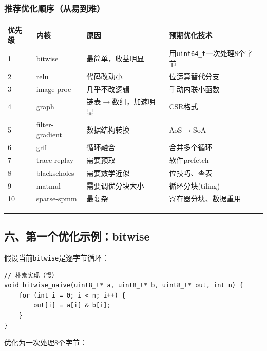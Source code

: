 \documentclass[11pt, a4paper]{article}
\begin{document}
\begin{aibox}
\subsubsection*{推荐优化顺序（从易到难）}

\vspace{0.5em}
\begin{tabularx}{\textwidth}{@{} l l X X @{}}
\toprule
优先级 & 内核 & 原因 & 预期优化技术 \\
\midrule
1 & bitwise & 最简单，收益明显 & 用\texttt{uint64\_t}一次处理8个字节 \\
2 & relu & 代码改动小 & 位运算替代分支 \\
3 & image-proc & 几乎不改逻辑 & 手动内联小函数 \\
4 & graph & 链表$\rightarrow$数组，加速明显 & CSR格式 \\
5 & filter-gradient & 数据结构转换 & AoS$\rightarrow$SoA \\
6 & grff & 循环融合 & 合并多个循环 \\
7 & trace-replay & 需要预取 & 软件prefetch \\
8 & blackscholes & 需要数学近似 & 位技巧、查表 \\
9 & matmul & 需要调优分块大小 & 循环分块(tiling) \\
10 & sparse-spmm & 最复杂 & 寄存器分块、数据重用 \\
\bottomrule
\end{tabularx}
\vspace{0.5em}

\begin{center}\rule{\textwidth}{0.4pt}\end{center}

\subsection*{六、第一个优化示例：bitwise}

假设当前\texttt{bitwise}是逐字节循环：

\begin{tcolorbox}[colback=white,colframe=gray!50!white,boxrule=0.5pt,arc=2pt,left=5pt,right=5pt,top=5pt,bottom=5pt]
\begin{verbatim}
// 朴素实现（慢）
void bitwise_naive(uint8_t* a, uint8_t* b, uint8_t* out, int n) {
    for (int i = 0; i < n; i++) {
        out[i] = a[i] & b[i];
    }
}
\end{verbatim}
\end{tcolorbox}

优化为一次处理8个字节：


\end{aibox}
\end{document}
